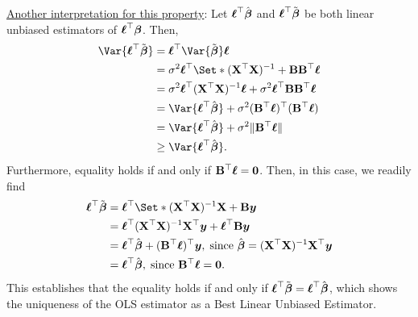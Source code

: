\underline{Another interpretation for this property}:
Let $ {\boldsymbol \ell}^\top \hat{{\boldsymbol \beta}} $ and $ {\boldsymbol \ell}^\top \tilde{{\boldsymbol \beta}} $
be both linear unbiased estimators of $ {\boldsymbol \ell}^\top {\boldsymbol \beta} $. Then,
\begin{align*}
    \Var{\Vector{\ell}^\top \tilde{\Vector{\beta}}}
     & =\Vector{\ell}^\top \Var{\tilde{\Vector{\beta}}}\Vector{\ell}                                                                                  \\
     & =\sigma^2 \Vector{\ell}^\top\Set*{(\Matrix{X}^\top \Matrix{X})^{-1}+\Matrix{B}\Matrix{B}^\top}\Vector{\ell}                                    \\
     & =\sigma^2 \Vector{\ell}^\top(\Matrix{X}^\top \Matrix{X})^{-1}\Vector{\ell}+\sigma^2 \Vector{\ell}^\top \Matrix{B}\Matrix{B}^\top \Vector{\ell} \\
     & =\Var{\Vector{\ell}^\top\hat{\Vector{\beta}}}+\sigma^2(\Matrix{B}^\top \Vector{\ell})^\top(\Matrix{B}^\top \Vector{\ell})                      \\
     & =\Var{\Vector{\ell}^\top\hat{\Vector{\beta}}}+\sigma^2\lVert \Matrix{B}^\top \Vector{\ell}\rVert                                               \\
     & \ge \Var{\Vector{\ell}^\top\hat{\Vector{\beta}}}.
\end{align*}
Furthermore, equality holds if and only if $ \mathbf{B}^\top {\boldsymbol \ell}={\boldsymbol 0} $.
Then, in this case, we readily find
\begin{align*}
    \Vector{\ell}^\top \tilde{\Vector{\beta}}
     & =\Vector{\ell}^\top\Set*{(\Matrix{X}^\top \Matrix{X})^{-1}\Matrix{X}+\Matrix{B}}\Vector{y}                                                                                                   \\
     & =\Vector{\ell}^\top(\Matrix{X}^\top \Matrix{X})^{-1}\Matrix{X}^\top\Vector{y}+\Vector{\ell}^\top\Matrix{B}\Vector{y}                                                                         \\
     & =\Vector{\ell}^\top \hat{\Vector{\beta}}+(\Matrix{B}^\top \Vector{\ell})^\top \Vector{y},\;\text{since $ \hat{\Vector{\beta}}=(\Matrix{X}^\top \Matrix{X})^{-1}\Matrix{X}^\top \Vector{y} $} \\
     & =\Vector{\ell}^\top \hat{\Vector{\beta}},\;\text{since $ \Matrix{B}^\top \Vector{\ell}=\Vector{0} $}.
\end{align*}
This establishes that the equality holds if and only if
$ {\boldsymbol \ell}^\top \tilde{{\boldsymbol \beta}}={\boldsymbol \ell}^\top \hat{{\boldsymbol \beta}} $,
which shows the uniqueness of the OLS estimator as a
Best Linear Unbiased Estimator.

